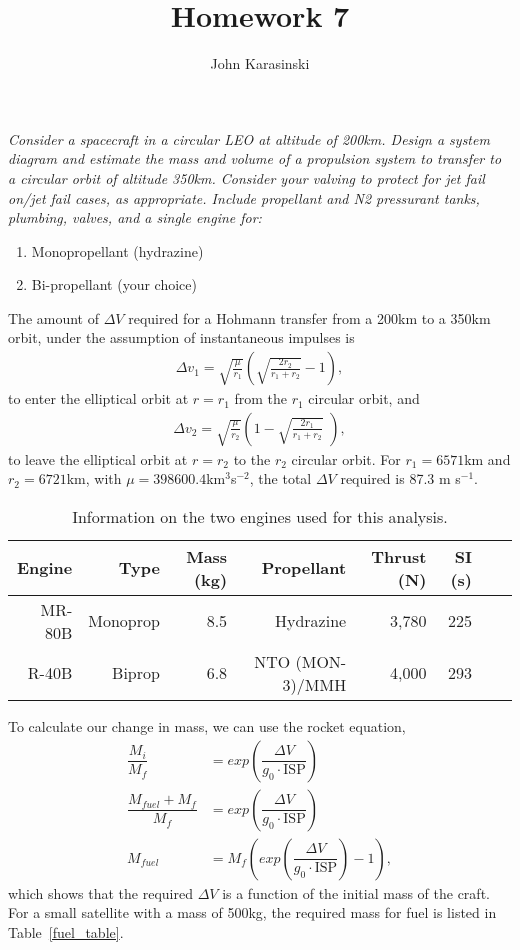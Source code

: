 \documentclass[onecolumn,10pt]{jhwhw}
\author{John Karasinski}
\title{Homework 7}
\begin{document}

\problem{}
\textit{Consider a spacecraft in a circular LEO at altitude of 200km. Design a system diagram and estimate the mass and volume of a propulsion system to transfer to a circular orbit of altitude 350km. Consider your valving to protect for jet fail on/jet fail cases, as appropriate. Include propellant and N2 pressurant tanks, plumbing, valves, and a single engine for:}
\begin{enumerate}
\item Monopropellant (hydrazine)
\item Bi-propellant (your choice)
\end{enumerate}

The amount of $\Delta V$ required for a Hohmann transfer from a 200km to a 350km orbit, under the assumption of instantaneous impulses is
\begin{align*}
\Delta v_1 = \sqrt{\frac{\mu}{r_1}} \left( \sqrt{\frac{2 r_2}{r_1+r_2}} - 1 \right),
\end{align*}
to enter the elliptical orbit at $r=r_1$ from the $r_1$ circular orbit, and
\begin{align*}
\Delta v_2  = \sqrt{\frac{\mu}{r_2}} \left( 1 - \sqrt{\frac{2 r_1}{r_1+r_2}}\,\,\right),
\end{align*}
to leave the elliptical orbit at $r=r_2$ to the $r_2$ circular orbit. For $r_1 = 6571$km and $r_2 = 6721$km, with $\mu=398600.4$km$^3$s$^{-2}$, the total $\Delta V$ required is 87.3 m s$^{-1}$.

\begin{table}[h]
\begin{center}
\begin{tabular}{*{8}{r}}
\toprule
Engine & Type     & Mass (kg) & Propellant & Thrust (N) & SI (s) \\
\midrule
MR-80B & Monoprop & 8.5 &       Hydrazine & 3,780 & 225 \\
R-40B  & Biprop   & 6.8 & NTO (MON-3)/MMH & 4,000 & 293 \\
\bottomrule
\end{tabular}
\end{center}
\caption{Information on the two engines used for this analysis.}
\end{table}

To calculate our change in mass, we can use the rocket equation,
\begin{align*}
\dfrac{M_i}{M_f} &= exp({\dfrac{\Delta V}{g_0 \cdot \mbox{ISP}}}) \\
\dfrac{M_{fuel} + M_f}{M_f} &= exp({\dfrac{\Delta V}{g_0 \cdot \mbox{ISP}}}) \\
M_{fuel} &= M_f \left( exp({\dfrac{\Delta V}{g_0 \cdot \mbox{ISP}}}) -1 \right),
\end{align*}
which shows that the required $\Delta V$ is a function of the initial mass of the craft. For a small satellite with a mass of 500kg, the required mass for fuel is listed in Table~\ref{fuel_table}.
\end{document}
